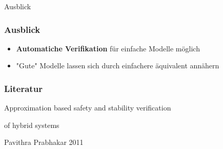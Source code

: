 \documentclass[ngerman]{beamer}
\begin{document}
\begin{section}{Ausblick}

\begin{frame}
    \frametitle{Ausblick}

    \begin{itemize}
        \item \textbf{Automatiche Verifikation} für einfache Modelle möglich
        \item "Gute" Modelle lassen sich durch einfachere äquivalent annähern
    \end{itemize}

    \begin{figure}
        \centering
        \def\svgwidth{0.6\columnwidth}
        
    \end{figure}
\end{frame}

\begin{frame}
    \frametitle{Literatur}
    \centering

    Approximation based safety and stability verification

    of hybrid systems

    \vspace{0.5cm}

    Pavithra Prabhakar 2011

\end{frame}

\end{section}
\end{document}
